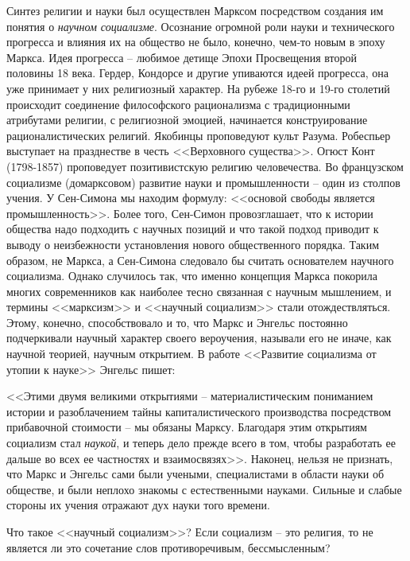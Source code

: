 \documentclass{book}
\begin{document}
Синтез религии и науки был осуществлен Марксом посред­ством создания им понятия о \textit{научном социализме}.  Осознание огромной роли науки и технического прогресса и влияния их на общество не было, конечно, чем-то новым в эпоху Маркса. Идея прогресса -- любимое детище Эпохи Просвещения второй половины 18 века. Гердер, Кондорсе и другие упиваются идеей прогресса, она уже принимает у них религиозный характер. На рубеже 18-го и 19-го столетий происходит соединение философского рационализма с традиционными атрибутами религии, с религиозной эмоцией, начинается конструирование рационалистических религий. Якобинцы проповедуют культ Разума. Робеспьер выступает на празднестве в честь <<Верховного существа>>. Огюст Конт (1798-1857) проповедует позитивистскую религию человечества. Во французском социализме (домарксовом) развитие науки и промышленности -- один из столпов учения. У Сен-Симона мы находим формулу: <<основой свободы является промышленность>>. Более того, Сен-Симон провозглашает, что к истории общества 
надо 
подходить с научных позиций и что такой подход приводит к выводу о неизбежности установления нового общественного порядка. Таким образом, не Маркса, а Сен-Симона следовало бы считать основателем научного социализма. Однако случилось так, что именно концепция Маркса покорила многих современников как наиболее тесно связанная с научным мышлением, и термины <<марксизм>> и <<научный социализм>> стали отождествляться. Этому, конечно, способствовало и то, что Маркс и Энгельс постоянно подчеркивали научный характер своего вероучения, называли его не иначе, как научной теорией, научным открытием. В работе <<Развитие социализма от утопии к науке>> Энгельс пишет:

<<Этими двумя великими открытиями -- материалистическим пониманием истории и разоблачением тайны капиталистиче­ского производства посредством прибавочной стоимости -- мы обязаны Марксу. Благодаря этим открытиям социализм стал \textit{наукой},  и теперь дело прежде всего в том, чтобы разработать ее дальше во всех ее частностях и взаимосвязях>>. Наконец, нельзя не признать, что Маркс и Энгельс сами были учеными, специалистами в области науки об обществе, и были неплохо знакомы с естественными науками. Сильные и слабые стороны их учения отражают дух науки того времени.

Что такое <<научный социализм>>? Если социализм -- это ре­лигия, то не является ли это сочетание слов противоречивым, бессмысленным?
\end{document}
